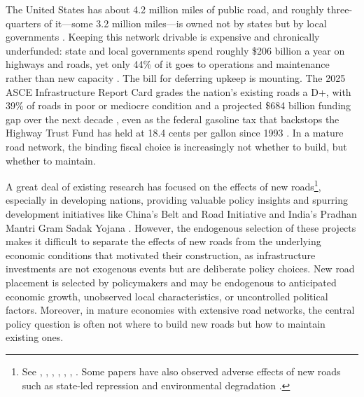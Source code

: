 The United States has about 4.2 million miles of public road, and roughly three-quarters of it---some 3.2 million miles---is owned not by states but by local governments \citep{fhwa2022}. Keeping this network drivable is expensive and chronically underfunded: state and local governments spend roughly \$206 billion a year on highways and roads, yet only 44\% of it goes to operations and maintenance rather than new capacity \citep{urban2021highway}. The bill for deferring upkeep is mounting. The 2025 ASCE Infrastructure Report Card grades the nation's existing roads a D+, with 39\% of roads in poor or mediocre condition and a projected \$684 billion funding gap over the next decade \citep{asce2025}, even as the federal gasoline tax that backstops the Highway Trust Fund has held at 18.4 cents per gallon since 1993 \citep{pgpf_htf_explained}. In a mature road network, the binding fiscal choice is increasingly not whether to build, but whether to maintain.

A great deal of existing research has focused on the effects of new roads\footnote{See \cite{ghani2016highway}, \cite{beenstock2016hedonic}, \cite{levkovich2016effects}, \cite{hoogendoorn2019house}, \cite{theisen2021road}, \cite{gibbons2019new}, \cite{fretz2022highways}. Some papers have also observed adverse effects of new roads such as state-led repression \citep{gonzalez2025} and environmental degradation \citep{asher2020eco}.}, especially in developing nations, providing valuable policy insights and spurring development initiatives like China's Belt and Road Initiative \citep{huang2016understanding} and India's Pradhan Mantri Gram Sadak Yojana \citep{asher2020}. However, the endogenous selection of these projects makes it difficult to separate the effects of new roads from the underlying economic conditions that motivated their construction, as infrastructure investments are not exogenous events but are deliberate policy choices. New road placement is selected by policymakers and may be endogenous to anticipated economic growth, unobserved local characteristics, or uncontrolled political factors. Moreover, in mature economies with extensive road networks, the central policy question is often not where to build new roads but how to maintain existing ones. 



